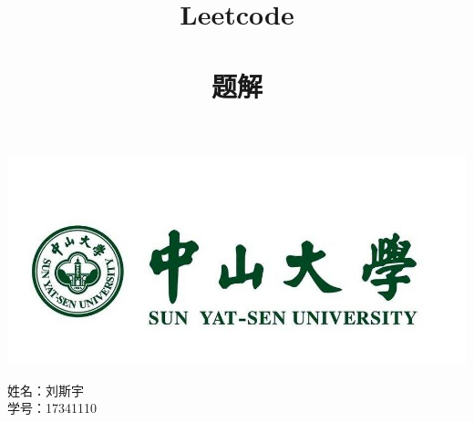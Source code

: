\documentclass[a4paper, 11pt]{article} %
\makeatletter
\renewcommand{\maketitle}{ %
\begin{center} %
{\LARGE\@title} %

\large{\@subtitle}

\vspace{1em} %

{\large\@author} %

\end{center}
}
\makeatother
\begin{document}
    
\includegraphics[scale=0.3]{sysu.jpeg}

\title{\textbf{\huge Leetcode}\\ %
\textbf{  }\\
\textbf{\huge 题解}
} %
\newcommand\@subtitle{}%


    
    





\maketitle %


\begin{center}

姓名：刘斯宇\\
学号：17341110
\end{center}

\tableofcontents
\newpage




\newpage
\end{document}
